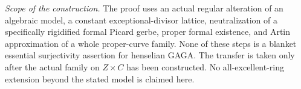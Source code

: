 \emph{Scope of the construction.}
The proof uses an actual regular
alteration of an algebraic model, a
constant exceptional-divisor lattice,
neutralization of a specifically
rigidified formal Picard gerbe, proper
formal existence, and Artin approximation
of a whole proper-curve family. None of
these steps is a blanket essential
surjectivity assertion for henselian
GAGA. The transfer is taken only after
the actual family on $Z\times C$ has
been constructed. No all-excellent-ring
extension beyond the stated model is
claimed here.
